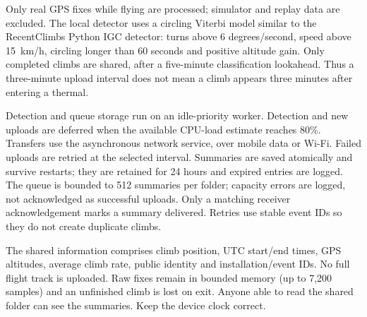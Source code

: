 Only real GPS fixes while flying are processed; simulator and replay data
are excluded. The local detector uses a circling Viterbi model similar to
the RecentClimbs Python IGC detector: turns above 6 degrees/second, speed
above 15~km/h, circling longer than 60 seconds and positive altitude gain.
Only completed climbs are shared, after a five-minute classification
lookahead. Thus a three-minute upload interval does not mean a climb
appears three minutes after entering a thermal.

Detection and queue storage run on an idle-priority worker. Detection and
new uploads are deferred when the available CPU-load estimate reaches
80\%. Transfers use the asynchronous network service, over mobile data or
Wi-Fi. Failed uploads are retried at the selected interval. Summaries are
saved atomically and survive restarts; they are retained for 24 hours and
expired entries are logged. The queue is bounded to 512 summaries per
folder; capacity errors are logged, not acknowledged as successful uploads.
Only a matching receiver acknowledgement marks a summary delivered.
Retries use stable event IDs so they do not create duplicate climbs.

The shared information comprises climb position, UTC start/end times,
GPS altitudes, average climb rate, public identity and installation/event IDs.
No full flight track is uploaded. Raw fixes remain in bounded memory
(up to 7,200 samples) and an unfinished climb is lost on exit.
Anyone able to read the shared folder can see the summaries.
Keep the device clock correct.

